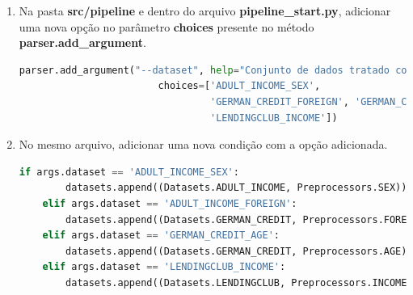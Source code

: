 \documentclass[Portugues,Final]{ic-tese-v3}
\begin{document}
\begin{enumerate}
\begin{lstlisting}[language=Python, label=cod:PipelinePreprocessors]
    def select_data_preprocessor(self, dataset, preprocessor):
        choice = [dataset, preprocessor]
        options = [
            ([Datasets.ADULT_INCOME, Preprocessors.SEX], (AdultDataset(), AdultSexPreprocessor(), AdultSexFairnessPipe())),
            ([Datasets.GERMAN_CREDIT, Preprocessors.AGE], (GermanDataset(), GermanAgePreprocessor(), GermanAgeFairnessPipe())),
            ([Datasets.GERMAN_CREDIT, Preprocessors.FOREIGN], (GermanDataset(), GermanForeignPreprocessor(), GermanForeignFairnessPipe())),
            ([Datasets.LENDINGCLUB, Preprocessors.INCOME], (LendingclubDataset(), LendingclubIncomePreprocessor(), LendingclubIncomeFairnessPipe())),
        ]

        for option, pipe_filter in options:
            if choice == option:
                dataset_pipe, data_preprocessor_filter, fairness_pipe = pipe_filter
                preprocessed_data_pipe = dataset_pipe >= data_preprocessor_filter == self.new_pipe()
                break

        return preprocessed_data_pipe, fairness_pipe
\end{lstlisting}

\item Na pasta \textbf{src/pipeline} e dentro do arquivo \textbf{pipeline\_start.py}, adicionar uma nova opção no parâmetro \textbf{choices} presente no método \textbf{parser.add\_argument}.

\begin{lstlisting}[language=Python, label=cod:ParserAddArgumentPipeline]
    parser.add_argument("--dataset", help="Conjunto de dados tratado com atributo protegido",
                        choices=['ADULT_INCOME_SEX',
                                 'GERMAN_CREDIT_FOREIGN', 'GERMAN_CREDIT_AGE',
                                 'LENDINGCLUB_INCOME'])
\end{lstlisting}

\item No mesmo arquivo, adicionar uma nova condição com a opção adicionada.

\begin{lstlisting}[language=Python, label=cod:IfPipelineStart]
    if args.dataset == 'ADULT_INCOME_SEX':
        datasets.append((Datasets.ADULT_INCOME, Preprocessors.SEX))
    elif args.dataset == 'ADULT_INCOME_FOREIGN':
        datasets.append((Datasets.GERMAN_CREDIT, Preprocessors.FOREIGN))
    elif args.dataset == 'GERMAN_CREDIT_AGE':
        datasets.append((Datasets.GERMAN_CREDIT, Preprocessors.AGE))
    elif args.dataset == 'LENDINGCLUB_INCOME':
        datasets.append((Datasets.LENDINGCLUB, Preprocessors.INCOME))]
\end{lstlisting}

\end{enumerate}
\end{document}
